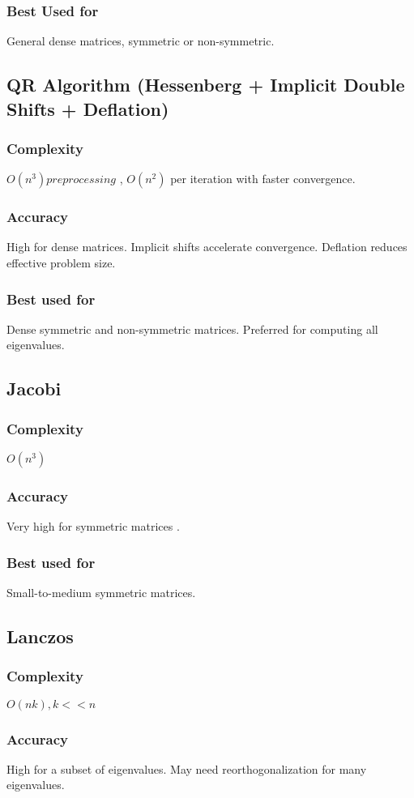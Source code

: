 \documentclass[a4paper,12pt]{article}
\begin{document}
\subsubsection{ Best Used for}
General dense matrices, symmetric or non-symmetric.
\subsection{QR Algorithm (Hessenberg + Implicit Double Shifts + Deflation)}
\subsubsection{Complexity}
$O(n^3) preprocessing$ , $O(n^2)$ per iteration with faster convergence.
\subsubsection{Accuracy}
High for dense matrices. Implicit shifts accelerate convergence. Deflation reduces effective problem size.
\subsubsection{Best used for}
Dense symmetric and non-symmetric matrices. Preferred for computing all eigenvalues.
\subsection{Jacobi}
\subsubsection{Complexity}
$O(n^3)$
\subsubsection{Accuracy}
Very high for symmetric matrices .
\subsubsection{Best used for}
Small-to-medium symmetric matrices.
\subsection{Lanczos}
\subsubsection{Complexity}
$O(nk),k<<n$
\subsubsection{Accuracy}
High for a subset of eigenvalues. May need reorthogonalization for many eigenvalues.
\end{document}
